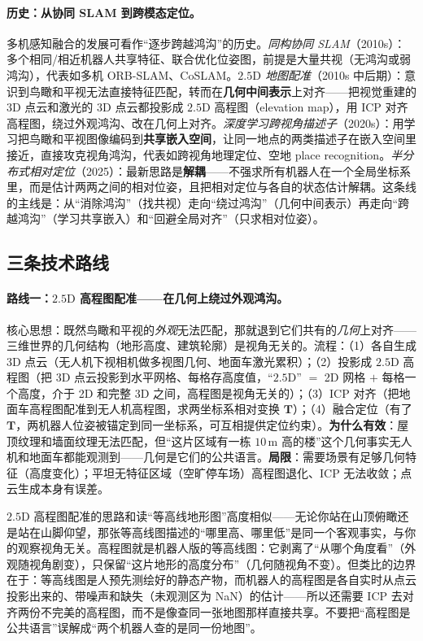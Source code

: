 \paragraph{历史：从协同 SLAM 到跨模态定位。}
多机感知融合的发展可看作“逐步跨越鸿沟”的历史。\emph{同构协同 SLAM}（2010s）：多个相同/相近机器人共享特征、联合优化位姿图，前提是大量共视（无鸿沟或弱鸿沟），代表如多机 ORB-SLAM、CoSLAM。\emph{$2.5\mathrm{D}$ 地图配准}（2010s 中后期）：意识到鸟瞰和平视无法直接特征匹配，转而在\textbf{几何中间表示}上对齐——把视觉重建的 3D 点云和激光的 3D 点云都投影成 $2.5\mathrm{D}$ 高程图（elevation map），用 ICP 对齐高程图，绕过外观鸿沟、改在几何上对齐\cite{aghs25dmap2017}。\emph{深度学习跨视角描述子}（2020s）：用学习把鸟瞰和平视图像编码到\textbf{共享嵌入空间}，让同一地点的两类描述子在嵌入空间里接近，直接攻克视角鸿沟，代表如跨视角地理定位、空地 place recognition。\emph{半分布式相对定位}（2025）：最新思路是\textbf{解耦}——不强求所有机器人在一个全局坐标系里，而是估计两两之间的相对位姿，且把相对定位与各自的状态估计解耦\cite{crossmodal2025semidist}。这条线的主线是：从“消除鸿沟”（找共视）走向“绕过鸿沟”（几何中间表示）再走向“跨越鸿沟”（学习共享嵌入）和“回避全局对齐”（只求相对位姿）。

\subsection{三条技术路线}
\label{sec:hmr-perception-routes}

\paragraph{路线一：$2.5\mathrm{D}$ 高程图配准——在几何上绕过外观鸿沟。}
核心思想：既然鸟瞰和平视的\emph{外观}无法匹配，那就退到它们共有的\emph{几何}上对齐——三维世界的几何结构（地形高度、建筑轮廓）是视角无关的。流程：（1）各自生成 3D 点云（无人机下视相机做多视图几何、地面车激光累积）；（2）投影成 $2.5\mathrm{D}$ 高程图（把 3D 点云投影到水平网格、每格存高度值，“$2.5\mathrm{D}$” $=$ 2D 网格 $+$ 每格一个高度，介于 2D 和完整 3D 之间，高程图是视角无关的）；（3）ICP 对齐（把地面车高程图配准到无人机高程图，求两坐标系相对变换 $\mathbf{T}$）；（4）融合定位（有了 $\mathbf{T}$，两机器人位姿被锚定到同一坐标系，可互相提供定位约束）。\textbf{为什么有效}：屋顶纹理和墙面纹理无法匹配，但“这片区域有一栋 $10\,\mathrm{m}$ 高的楼”这个几何事实无人机和地面车都能观测到——几何是它们的公共语言。\textbf{局限}：需要场景有足够几何特征（高度变化）；平坦无特征区域（空旷停车场）高程图退化、ICP 无法收敛；点云生成本身有误差。

\begin{insight}
$2.5\mathrm{D}$ 高程图配准的思路和读“等高线地形图”高度相似——无论你站在山顶俯瞰还是站在山脚仰望，那张等高线图描述的“哪里高、哪里低”是同一个客观事实，与你的观察视角无关。高程图就是机器人版的等高线图：它剥离了“从哪个角度看”（外观随视角剧变），只保留“这片地形的高度分布”（几何随视角不变）。但类比的边界在于：等高线图是人预先测绘好的静态产物，而机器人的高程图是各自实时从点云投影出来的、带噪声和缺失（未观测区为 NaN）的估计——所以还需要 ICP 去对齐两份不完美的高程图，而不是像查同一张地图那样直接共享。不要把“高程图是公共语言”误解成“两个机器人查的是同一份地图”。
\end{insight}

